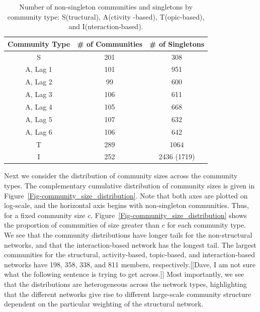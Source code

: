 \begin{table}[ht]
	\caption{Number of non-singleton communities and singletons by community type: S(tructural), A(ctivity -based), T(opic-based), and I(nteraction-based).}
	\centering
	\begin{tabular}{| c | c | c |}
		\hline Community Type & \# of Communities & \# of Singletons \\ \hline
		S & 201 & 308 \\
		A, Lag 1 & 101 & 951 \\
		A, Lag 2 & 99 & 600 \\
		A, Lag 3 & 106 & 611 \\
		A, Lag 4 & 105 & 668 \\
		A, Lag 5 & 107 & 632 \\
		A, Lag 6 & 106 & 642 \\
		T & 289 & 1064 \\
		I & 252 & 2436 (1719) \\ \hline
	\end{tabular}
	\label{Table-comm_count}
\end{table}

Next we consider the distribution of community sizes across the community types. The complementary cumulative distribution of community sizes is given in Figure~\ref{Fig-community_size_distribution}. Note that both axes are plotted on log-scale, and the horizontal axis begins with non-singleton communities. Thus, for a fixed community size $c$, Figure~\ref{Fig-community_size_distribution} shows the proportion of communities of size greater than $c$ for each community type. We see that the community distributions have longer tails for the non-structural networks, and that the interaction-based network has the longest tail. The largest communities for the structural, activity-based, topic-based, and interaction-based networks have 198, 358, 338, and 811 members, respectively.[[Dave, I am not sure what the following sentence is trying to get across.]] Most importantly, we see that the distributions are heterogeneous across the network types, highlighting that the different networks give rise to different large-scale community structure dependent on the particular weighting of the structural network.

